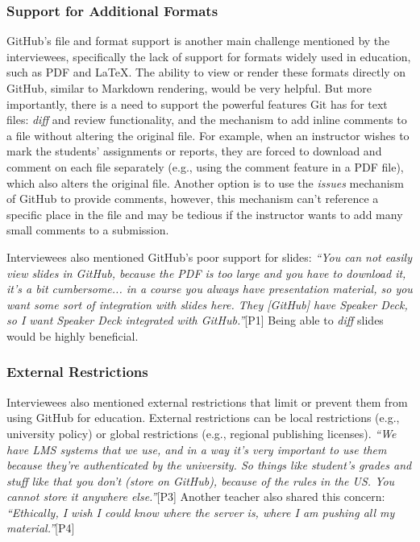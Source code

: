 \subsubsection{Support for Additional Formats}
GitHub's file and format support is another main challenge mentioned by the interviewees, specifically the lack of support for formats widely used in education, such as PDF and LaTeX. The ability to view or render these formats directly on GitHub, similar to Markdown rendering, would be very helpful. But more importantly, there is a need to support the powerful features Git has for text files: \textit{diff} and review functionality, and the mechanism to add inline comments to a file without altering the original file. For example, when an instructor wishes to mark the students' assignments or reports, they are forced to download and comment on each file separately (e.g., using the comment feature in a PDF file), which also alters the original file. Another option is to use the \textit{issues} mechanism of GitHub to provide comments, however, this mechanism can't reference a specific place in the file and may be tedious if the instructor wants to add many small comments to a submission.

Interviewees also mentioned GitHub's poor support for slides: \textit{``You can not easily view slides in GitHub, because the PDF is too large and you have to download it, it's a bit cumbersome... in a course you always have presentation material, so you want some sort of integration with slides here. They [GitHub] have Speaker Deck, so I want Speaker Deck integrated with GitHub.''}[P1] Being able to \textit{diff} slides would be highly beneficial.

\subsubsection{External Restrictions}
Interviewees also mentioned external restrictions that limit or prevent them from using GitHub for education. External restrictions can be local restrictions (e.g., university policy) or global restrictions (e.g., regional publishing licenses). \textit{``We have LMS systems that we use, and in a way it's very important to use them because they're authenticated by the university. So things like student's grades and stuff like that you don't (store on GitHub), because of the rules in the US. You cannot store it anywhere else.''}[P3]
Another teacher also shared this concern:
\textit{``Ethically, I wish I could know where the server is, where I am pushing all my material.''}[P4]

